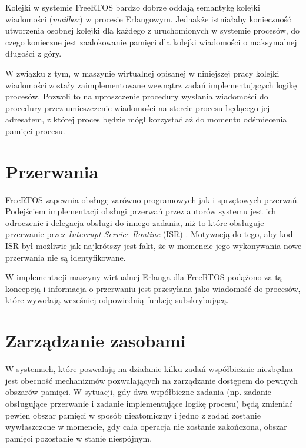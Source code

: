 Kolejki w systemie FreeRTOS bardzo dobrze oddają semantykę kolejki wiadomości (\emph{mailbox}) w procesie Erlangowym. Jednakże istniałaby konieczność utworzenia osobnej kolejki dla każdego z uruchomionych w systemie procesów, do czego konieczne jest zaalokowanie pamięci dla kolejki wiadomości o maksymalnej długości z góry. 

W związku z tym, w maszynie wirtualnej opisanej w niniejszej pracy kolejki wiadomości zostały zaimplementowane wewnątrz zadań implementujących logikę procesów. Pozwoli to na uproszczenie procedury wysłania wiadomości do procedury przez umieszczenie wiadomości na stercie procesu będącego jej adresatem, z której proces będzie mógł korzystać aż do momentu odśmiecenia pamięci procesu. 

\section{Przerwania}
\label{sec:rtosPrzerwania}

FreeRTOS zapewnia obsługę zarówno programowych jak i sprzętowych przerwań. Podejściem implementacji obsługi przerwań przez autorów systemu jest ich odroczenie i delegacja obsługi do innego zadania, niż to które obsługuje przerwanie przez \emph{Interrupt Service Routine} (ISR) \cite{Barry2011}. Motywacją do tego, aby kod ISR był możliwie jak najkrótszy jest fakt, że w momencie jego wykonywania nowe przerwania nie są identyfikowane.

W implementacji maszyny wirtualnej Erlanga dla FreeRTOS podążono za tą koncepcją i informacja o przerwaniu jest przesyłana jako wiadomość do procesów, które wywołają wcześniej odpowiednią funkcję subskrybującą.

\section{Zarządzanie zasobami}
\label{sec:rtosZasoby}

W systemach, które pozwalają na działanie kilku zadań współbieżnie niezbędna jest obecność mechanizmów pozwalających na 
zarządzanie dostępem do pewnych obszarów pamięci. W sytuacji, gdy dwa współbieżne zadania (np. zadanie obsługujące przerwanie i 
zadanie implementujące logikę procesu) będą zmieniać pewien obszar pamięci w sposób nieatomiczny i jedno z zadań zostanie wywłaszczone w momencie, gdy cała operacja nie zostanie zakończona, obszar pamięci pozostanie w stanie niespójnym.

